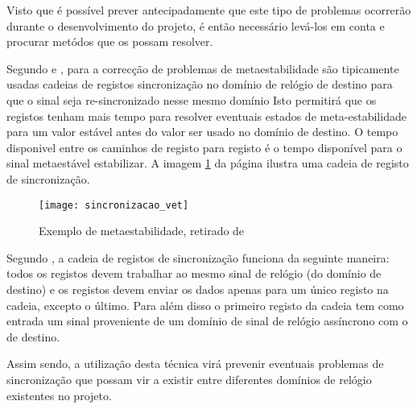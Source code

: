 Visto que é possível prever antecipadamente que este tipo de problemas ocorrerão durante o desenvolvimento do projeto, é então necessário levá-los em conta e procurar metódos que os possam resolver.

Segundo \cite{R037} e \cite{R024}, para a correcção de problemas de metaestabilidade são tipicamente usadas cadeias de registos sincronização no domínio de relógio de destino para que o sinal seja re-sincronizado nesse mesmo domínio Isto permitirá que os registos tenham mais tempo para resolver eventuais estados de meta-estabilidade para um valor estável antes do valor ser usado no domínio de destino.  O tempo disponivel entre os caminhos de registo para registo é o tempo disponível para o sinal metaestável estabilizar. A imagem \ref{fig:sincronizacao} da página \pageref{fig:sincronizacao} ilustra uma cadeia de registo de sincronização.


\begin{figure}[h!]
	\begin{center}
		\leavevmode
		\texttt{[image: sincronizacao\_vet]}
		\caption{Exemplo de metaestabilidade, retirado de \cite{R037}}
		\label{fig:sincronizacao}
	\end{center}
\end{figure}

Segundo \cite{R037}, a cadeia de registos de sincronização funciona da seguinte maneira: todos os registos devem trabalhar ao mesmo sinal de relógio (do domínio de destino) e os registos devem enviar os dados apenas para um único registo na cadeia, excepto o último. Para além disso o primeiro registo da cadeia tem como entrada um sinal proveniente de um domínio de sinal de relógio assíncrono com o de destino.

Assim sendo, a utilização desta técnica virá prevenir eventuais problemas de sincronização que possam vir a existir entre diferentes domínios de relógio existentes no projeto.